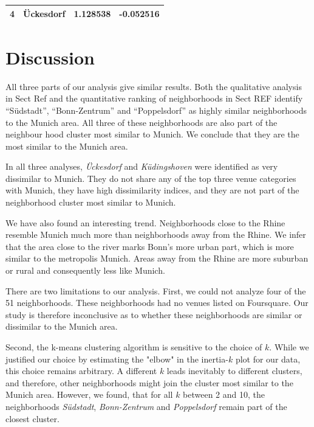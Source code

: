\documentclass[UKenglish]{scrreprt}
\begin{document}
\begin{table}
\begin{tabular}{lp{5cm}rr}
		4             &                                                                                                                                                                                                                                                                                                                                                                                                                                                                     Ückesdorf &                  1.128538 &              -0.052516 \\
		\bottomrule
	\end{tabular}
\end{table}


\chapter{Discussion}
\label{sec:Discussion}
All three parts of our analysis give similar results. Both the qualitative analysis in Sect Ref and the quantitative ranking of neighborhoods in Sect REF identify \enquote{Südstadt}, \enquote{Bonn-Zentrum} and \enquote{Poppelsdorf} as highly similar neighborhoods to the Munich area. All three of these neighborhoods are also part of the neighbour hood cluster most similar to Munich.  We conclude that they are the most similar to the Munich area.

In all three analyses, \emph{Ückesdorf} and \emph{Küdingshoven} were identified as very dissimilar to Munich. They do not share any of the top three venue categories with Munich, they have high dissimilarity indices, and they are not part of the neighborhood cluster most similar to Munich.

We have also found an interesting trend. Neighborhoods close to the Rhine resemble Munich much more than neighborhoods away from the Rhine. We infer that the area close to the river marks Bonn's more urban part, which is more similar to the metropolis Munich. Areas away from the Rhine are more suburban or rural and consequently less like Munich.

There are two limitations to our analysis. First, we could not analyze four of the 51 neighborhoods. These neighborhoods had no venues listed on Foursquare. Our study is therefore inconclusive as to whether these neighborhoods are similar or dissimilar to the Munich area. 

Second, the k-means clustering algorithm is sensitive to the choice of $k$. While we justified our choice by estimating the "elbow" in the inertia-$k$ plot for our data, this choice remains arbitrary. A different $k$ leads inevitably to different clusters, and therefore, other neighborhoods might join the cluster most similar to the Munich area. However, we found, that for all $k$ between 2 and 10, the neighborhoods \emph{Südstadt}, \emph{Bonn-Zentrum} and \emph{Poppelsdorf} remain part of the closest cluster.
\end{document}
